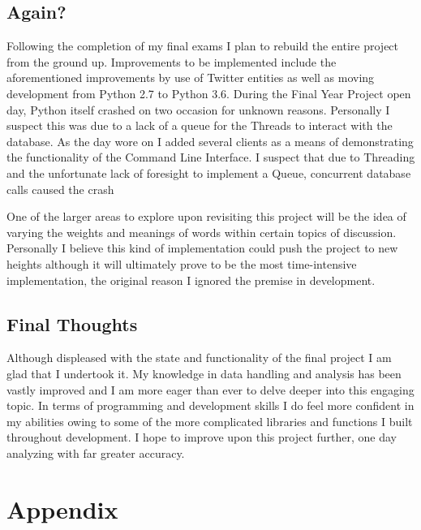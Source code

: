 \documentclass[12pt,a4paper]{report}
\begin{document}
  \section{Again?}
    Following the completion of my final exams I plan to rebuild the entire project from the ground up. Improvements to be implemented include the aforementioned improvements by use of Twitter entities\cite{TwitterEntities} as well as moving development from Python 2.7 to Python 3.6. During the Final Year Project open day, Python itself crashed on two occasion for unknown reasons. Personally I suspect this was due to a lack of a queue for the Threads to interact with the database. As the day wore on I added several clients as a means of demonstrating the functionality of the Command Line Interface. I suspect that due to Threading and the unfortunate lack of foresight to implement a Queue, concurrent database calls caused the crash
    \par
    One of the larger areas to explore upon revisiting this project will be the idea of varying the weights and meanings of words within certain topics of discussion. Personally I believe this kind of implementation could push the project to new heights although it will ultimately prove to be the most time-intensive implementation, the original reason I ignored the premise in development.
  \section{Final Thoughts}
    Although displeased with the state and functionality of the final project I am glad that I undertook it. My knowledge in data handling and analysis has been vastly improved and I am more eager than ever to delve deeper into this engaging topic. In terms of programming and development skills I do feel more confident in my abilities owing to some of the more complicated libraries and functions I built throughout development. I hope to improve upon this project further, one day analyzing with far greater accuracy.

\chapter{Appendix}
\end{document}
